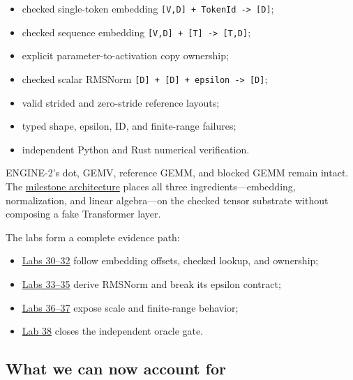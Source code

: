 \documentclass[
  10pt,
]{article}
\providecommand{\tightlist}{%
  \setlength{\itemsep}{0pt}\setlength{\parskip}{0pt}}
\begin{document}
\begin{itemize}
\tightlist
\item
  checked single-token embedding
  \texttt{{[}V,D{]}\ +\ TokenId\ -\textgreater{}\ {[}D{]}};
\item
  checked sequence embedding
  \texttt{{[}V,D{]}\ +\ {[}T{]}\ -\textgreater{}\ {[}T,D{]}};
\item
  explicit parameter-to-activation copy ownership;
\item
  checked scalar RMSNorm
  \texttt{{[}D{]}\ +\ {[}D{]}\ +\ epsilon\ -\textgreater{}\ {[}D{]}};
\item
  valid strided and zero-stride reference layouts;
\item
  typed shape, epsilon, ID, and finite-range failures;
\item
  independent Python and Rust numerical verification.
\end{itemize}

ENGINE-2's dot, GEMV, reference GEMM, and blocked GEMM remain intact.
The
\href{https://github.com/hermonai/inside-the-llm-engine/blob/astra-visual-rewrite/diagrams/transformer/chapter07-engine-architecture.txt}{milestone
architecture} places all three ingredients---embedding, normalization,
and linear algebra---on the checked tensor substrate without composing a
fake Transformer layer.

The labs form a complete evidence path:

\begin{itemize}
\tightlist
\item
  \href{https://github.com/hermonai/inside-the-llm-engine/blob/astra-visual-rewrite/labs/README.md}{Labs
  30--32} follow embedding offsets, checked lookup, and ownership;
\item
  \href{https://github.com/hermonai/inside-the-llm-engine/blob/astra-visual-rewrite/labs/README.md}{Labs
  33--35} derive RMSNorm and break its epsilon contract;
\item
  \href{https://github.com/hermonai/inside-the-llm-engine/blob/astra-visual-rewrite/labs/README.md}{Labs
  36--37} expose scale and finite-range behavior;
\item
  \href{https://github.com/hermonai/inside-the-llm-engine/blob/astra-visual-rewrite/labs/lab-38-rust-python-rmsnorm.md}{Lab
  38} closes the independent oracle gate.
\end{itemize}

\subsection{What we can now account
for}\label{what-we-can-now-account-for}
\end{document}
